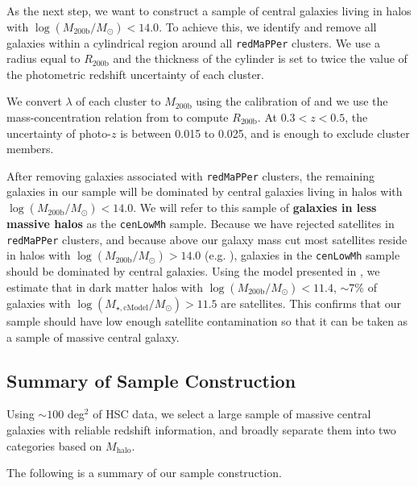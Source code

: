 \documentclass[a4paper,fleqn,usenatbib]{mnras}
\def\redm{\texttt{redMaPPer}}
\def\nbcg{\texttt{cenLowMh}}
\def\logmh{{$\log (M_{\mathrm{200b}}/M_{\odot})$}}
\def\logmcmodel{{$\log (M_{\star,\mathrm{cModel}}/M_{\odot})$}}
\begin{document}
    As the next step, we want to construct a sample of central galaxies living in halos 
    with \logmh{}$<14.0$. 
    To achieve this, we identify and remove all galaxies within a cylindrical region 
    around all \redm{} clusters. 
    We use a radius equal to $R_{\mathrm{200b}}$ and the thickness of the cylinder is 
    set to twice the value of the photometric redshift uncertainty of each cluster.

    We convert $\lambda$ of each cluster to $M_{\mathrm{200b}}$ using the calibration 
    of \citet{Simet2016} and we use the mass-concentration relation from 
    \citet{Diemer2015} to compute $R_{\mathrm{200b}}$. 
    At $0.3 < z < 0.5$, the uncertainty of photo-$z$ is between 0.015 to 0.025, and 
    is enough to exclude cluster members.
    
    After removing galaxies associated with \redm{} clusters, the remaining galaxies 
    in our sample will be dominated by central galaxies living in halos with 
    \logmh{}$< 14.0$. 
    We will refer to this sample of \textbf{galaxies in less massive halos} as the 
    \nbcg{} sample. 
    Because we have rejected satellites in \redm{} clusters, and because above our 
    galaxy mass cut most satellites reside in halos with 
    \logmh$>14.0$ (e.g. \citealt{Reid2014, Hoshino2015, Saito2016, vanUitert2016}), 
    galaxies in the \nbcg{} sample should  be dominated by central galaxies.
    Using the model presented in \citet{Saito2016}, we estimate that in dark matter 
    halos with \logmh$<11.4$, $\sim 7$\% of galaxies with \logmcmodel{}$>11.5$ are 
    satellites.
    This confirms that our sample should have low enough satellite contamination 
    so that it can be taken as a sample of massive central galaxy.     

\subsection{Summary of Sample Construction}
    \label{ssec:sample}

    Using ${\sim} 100$ deg$^2$ of HSC data, we select a large sample of massive central 
    galaxies with reliable redshift information, and broadly separate them into two 
    categories based on $M_{\mathrm{halo}}$.
    
    The following is a summary of our sample construction. 
        
\end{document}
